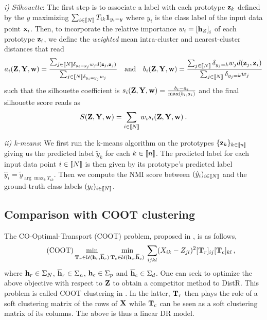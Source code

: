 \textit{i) Silhouette}: The first step is to associate a label with each prototype ${\mathbf{z}}_k$ defined by the $y$ maximizing $\sum_{i \in {[\![N]\!]}} T_{ik} \bm{1}_{y_i = y}$ where $y_i$ is the class label of the input data point ${\mathbf{x}}_i$. Then, to incorporate the relative importance $w_i = \left[{\mathbf{h}}_Z\right]_i$ of each prototype ${\mathbf{z}}_i$, we define the \emph{weighted} mean intra-cluster and nearest-cluster distances that read 
	\begin{equation}
		a_i (\mZ, \mY, \vw)= \frac{\sum_{j\in \integ{N} \delta_{y_i =y_j} w_j d(\vz_j, \vz_j)}}{\sum_{j \in \integ{N} \delta_{y_i = y_j} w_j }} \quad \text{and} \quad b_i (\mZ, \mY, \vw)= \frac{\sum_{j \in \integ{N}} \delta_{y_j = k} w_j d(\vz_j, \vz_i)}{ \sum_{j \in \integ{N}} \delta_{y_j = k}w_j }
	\end{equation}
	such that the silhouette coefficient is $s_i({\mathbf{Z}}, {\mathbf{Y}}, {\mathbf{w}}) = \frac{b_i - a_i}{\max(b_i, a_i)}$ and the final silhouette score reads as
	\begin{equation}
		S({\mathbf{Z}}, {\mathbf{Y}}, {\mathbf{w}}) = \sum_{i \in {[\![N]\!]}} w_i s_i({\mathbf{Z}}, {\mathbf{Y}}, {\mathbf{w}}) \:.
	\end{equation}

\textit{ii) k-means}: We first run the k-means algorithm on the prototypes $\{{\mathbf{z}}_k\}_{k \in {[\![n]\!]}}$ giving us the predicted label $\tilde{y}_k$ for each $k \in {[\![n]\!]}$. The predicted label for each input data point $i \in {[\![N]\!]}$ is then given by its prototype's predicted label \ie $\hat{y}_i = \tilde{y}_{\arg \max_k T_{ik}}$. Then we compute the NMI score \cite{kvaalseth2017normalized} between $(\hat{y}_i)_{i \in {[\![N]\!]}}$ and the ground-truth class labels $(y_i)_{i \in {[\![N]\!]}}$.

\subsection{Comparison with COOT clustering}\label{sec:coot_exp}

The CO-Optimal-Transport (COOT) problem, proposed in \cite{redko2020co}, is as follows,
\begin{align}\tag{COOT}
	\label{eq:coot_pb}
	\min_{{\mathbf{T}}_r \in {\mathcal{U}}({\mathbf{h}}_r, \overline{{\mathbf{h}}}_r)} \min_{ {\mathbf{T}}_c \in {\mathcal{U}}({\mathbf{h}}_c, \overline{{\mathbf{h}}}_c)} \: \sum_{ijkl} (X_{ik} - Z_{jl})^2 [{\mathbf{T}}_r]_{ij} [{\mathbf{T}}_c]_{kl} \,,
\end{align}
where ${\mathbf{h}}_r \in \Sigma_N$, $\overline{{\mathbf{h}}}_r \in \Sigma_n$, ${\mathbf{h}}_c \in \Sigma_p$ and $\overline{{\mathbf{h}}}_c \in \Sigma_d$. 
One can seek to optimize the above objective with respect to ${\mathbf{Z}}$ to obtain a competitor method to DistR. This problem is called COOT clustering in \cite{redko2020co}. In the latter, ${\mathbf{T}}_r$ then plays the role of a soft clustering matrix of the rows of ${\mathbf{X}}$ while ${\mathbf{T}}_c$ can be seen as a soft clustering matrix of its columns. The above is thus a linear DR model.



